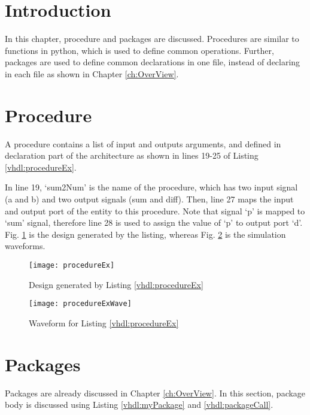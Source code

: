 \section{Introduction}
In this chapter, procedure and packages are discussed. Procedures are similar to functions in python, which is used to define common operations. Further, packages are used to define common declarations in one file, instead of declaring in each file as shown in Chapter \ref{ch:OverView}. 

\section{Procedure}
A procedure contains a list of input and outputs arguments, and defined in declaration part of the architecture as shown in lines 19-25 of Listing \ref{vhdl:procedureEx}. 

\begin{explanation}
	In line 19, `sum2Num' is the name of the procedure, which has two input signal (a and b) and two output signals (sum and diff). Then, line 27 maps the input and output port of the entity to this procedure. Note that signal `p' is mapped to `sum' signal, therefore line 28 is used to assign the value of `p' to output port `d'. Fig. \ref{fig:procedureEx} is the design generated by the listing, whereas  Fig. \ref{fig:procedureExWave} is the simulation waveforms. 
\end{explanation}


\begin{figure}[!h]
	\centering
	\texttt{[image: procedureEx]}
	\caption{Design generated by Listing \ref{vhdl:procedureEx}}
	\label{fig:procedureEx}
\end{figure}

\begin{figure}[!h]
	\centering
	\texttt{[image: procedureExWave]}
	\caption{Waveform for Listing \ref{vhdl:procedureEx}}
	\label{fig:procedureExWave}
\end{figure}

\section{Packages}
Packages are already discussed in Chapter \ref{ch:OverView}. In this section, package body is discussed using Listing \ref{vhdl:myPackage} and \ref{vhdl:packageCall}.

